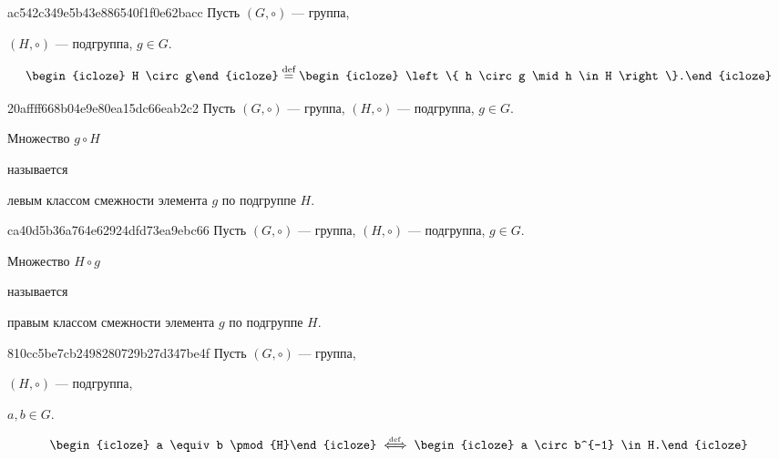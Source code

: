 \begin{note}{ac542c349e5b43e886540f1f0e62bacc}
    Пусть \({ (G, \circ) }\) --- группа, \begin{icloze}{3}\({ (H, \circ) }\) --- подгруппа,\: \({ g \in G }\).\end{icloze}
    \[
        \begin{icloze}{2}H \circ g\end{icloze} \overset{\text{def}}= \begin{icloze}{1}\left\{ h \circ g \mid h \in H \right\}.\end{icloze}
    \]
\end{note}

\begin{note}{20affff668b04e9e80ea15dc66eab2c2}
    Пусть \({ (G, \circ) }\) --- группа, \({ (H, \circ) }\) --- подгруппа,\: \({ g \in G }\).
    \begin{icloze}{2}Множество \({ g \circ H }\)\end{icloze} называется \begin{icloze}{1}левым классом смежности элемента \({ g }\) по подгруппе \({ H }\).\end{icloze}
\end{note}

\begin{note}{ca40d5b36a764e62924dfd73ea9ebc66}
    Пусть \({ (G, \circ) }\) --- группа, \({ (H, \circ) }\) --- подгруппа,\: \({ g \in G }\).
    \begin{icloze}{2}Множество \({ H \circ g }\)\end{icloze} называется \begin{icloze}{1}правым классом смежности элемента \({ g }\) по подгруппе \({ H }\).\end{icloze}
\end{note}

\begin{note}{810cc5be7cb2498280729b27d347be4f}
    Пусть \({ (G, \circ) }\) --- группа, \begin{icloze}{3}\({ (H, \circ) }\) --- подгруппа,\end{icloze}\: \begin{icloze}{4}\({ a, b \in G }\).\end{icloze}
    \[
        \begin{icloze}{2}a \equiv b \pmod{H}\end{icloze} \overset{\hspace{-1pt}\text{\tiny def}}\iff \begin{icloze}{1}a \circ b^{-1} \in H.\end{icloze}
    \]
\end{note}

